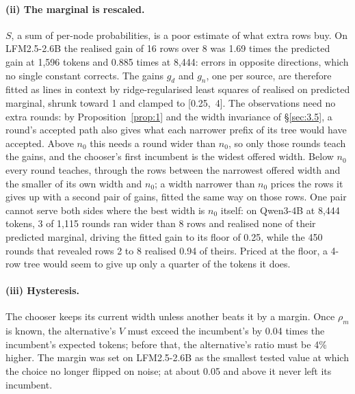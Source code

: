 \documentclass[10pt,twocolumn,letterpaper]{article}
\begin{document}
\paragraph{(ii) The marginal is rescaled.} $S$, a sum of per-node probabilities, is a poor estimate of what extra rows buy. On LFM2.5-2.6B the realised gain of 16 rows over 8 was 1.69 times the predicted gain at 1,596 tokens and 0.885 times at 8,444: errors in opposite directions, which no single constant corrects. The gains $g_{d}$ and $g_{n}$, one per source, are therefore fitted as lines in context by ridge-regularised least squares of realised on predicted marginal, shrunk toward 1 and clamped to [0.25,~4]. The observations need no extra rounds: by Proposition~\ref{prop:1} and the width invariance of \S\ref{sec:3.5}, a round's accepted path also gives what each narrower prefix of its tree would have accepted. Above $n_{0}$ this needs a round wider than $n_{0}$, so only those rounds teach the gains, and the chooser's first incumbent is the widest offered width. Below $n_{0}$ every round teaches, through the rows between the narrowest offered width and the smaller of its own width and $n_{0}$; a width narrower than $n_{0}$ prices the rows it gives up with a second pair of gains, fitted the same way on those rows. One pair cannot serve both sides where the best width is $n_{0}$ itself: on Qwen3-4B at 8,444 tokens, 3 of 1,115 rounds ran wider than 8 rows and realised none of their predicted marginal, driving the fitted gain to its floor of 0.25, while the 450 rounds that revealed rows 2 to 8 realised 0.94 of theirs. Priced at the floor, a 4-row tree would seem to give up only a quarter of the tokens it does.

\paragraph{(iii) Hysteresis.} The chooser keeps its current width unless another beats it by a margin. Once $\rho_{m}$ is known, the alternative's $V$ must exceed the incumbent's by 0.04 times the incumbent's expected tokens; before that, the alternative's ratio must be 4\% higher. The margin was set on LFM2.5-2.6B as the smallest tested value at which the choice no longer flipped on noise; at about 0.05 and above it never left its incumbent.
\end{document}
